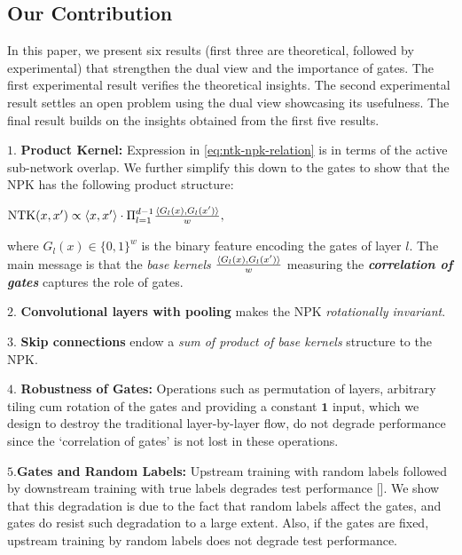 \subsection{Our Contribution}
In this paper, we present six results (first three are theoretical, followed by experimental) that strengthen the dual view and the importance of gates. The first experimental result verifies the theoretical insights. The second experimental result settles an open problem using the dual view showcasing its usefulness. The final result builds on the insights obtained from the first five results. 

\indent\quad$1.$ \textbf{Product Kernel:} Expression in \eqref{eq:ntk-npk-relation} is in terms of the active sub-network overlap. We further simplify this down to the gates to show that the NPK has the following product structure:
\centerline{$\text{NTK}(x,x') \propto \langle x,x'\rangle\cdot \Pi_{l=1}^{d-1} \frac{\langle G_l(x),G_l(x')\rangle}w,$}

where $G_l(x)\in\{0,1\}^w$ is the binary feature encoding the gates of layer $l$. The main message is that the \emph{base kernels} $\frac{\langle G_l(x),G_l(x')\rangle}w$ measuring the \textbf{\emph{correlation of gates} } captures the role of gates.

\indent\quad$2.$ \textbf{Convolutional layers with pooling} makes the NPK \emph{rotationally invariant}.

\indent\quad$3.$ \textbf{Skip connections} endow a \emph{sum of product of base kernels} structure to the NPK.

\indent\quad$4.$ \textbf{Robustness of Gates:} Operations such as permutation of layers, arbitrary tiling cum rotation of the gates and providing a constant $\mathbf{1}$ input, which we design to destroy the traditional layer-by-layer flow, do not degrade performance since the `correlation of gates' is not lost in these operations.

\indent\quad$5.$\textbf{Gates and Random Labels:} Upstream training with random labels followed by downstream training with true labels degrades test performance []. We show that this degradation is due to the fact that random labels affect the gates, and gates do resist such degradation to a large extent. Also, if the gates are fixed, upstream training by random labels does not degrade test performance.

